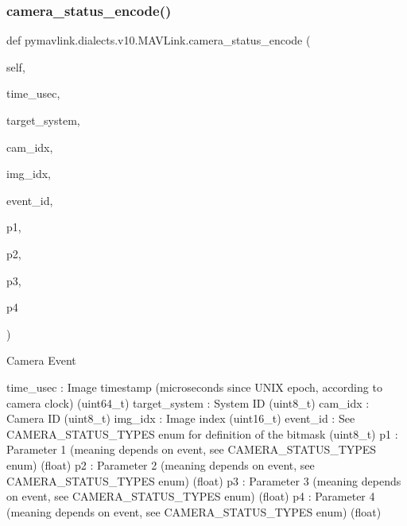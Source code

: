 \begin{DoxyVerb}
\begin{DoxyVerb}
\subsubsection{\texorpdfstring{camera\+\_\+status\+\_\+encode()}{camera\_status\_encode()}}
{\footnotesize\ttfamily def pymavlink.\+dialects.\+v10.\+M\+A\+V\+Link.\+camera\+\_\+status\+\_\+encode (\begin{DoxyParamCaption}\item[{}]{self,  }\item[{}]{time\+\_\+usec,  }\item[{}]{target\+\_\+system,  }\item[{}]{cam\+\_\+idx,  }\item[{}]{img\+\_\+idx,  }\item[{}]{event\+\_\+id,  }\item[{}]{p1,  }\item[{}]{p2,  }\item[{}]{p3,  }\item[{}]{p4 }\end{DoxyParamCaption})}

\begin{DoxyVerb}Camera Event

time_usec                 : Image timestamp (microseconds since UNIX epoch, according to camera clock) (uint64_t)
target_system             : System ID (uint8_t)
cam_idx                   : Camera ID (uint8_t)
img_idx                   : Image index (uint16_t)
event_id                  : See CAMERA_STATUS_TYPES enum for definition of the bitmask (uint8_t)
p1                        : Parameter 1 (meaning depends on event, see CAMERA_STATUS_TYPES enum) (float)
p2                        : Parameter 2 (meaning depends on event, see CAMERA_STATUS_TYPES enum) (float)
p3                        : Parameter 3 (meaning depends on event, see CAMERA_STATUS_TYPES enum) (float)
p4                        : Parameter 4 (meaning depends on event, see CAMERA_STATUS_TYPES enum) (float)\end{DoxyVerb}
 \mbox{\label{classpymavlink_1_1dialects_1_1v10_1_1MAVLink_a26f5b8a5517f932a4c4329b22b2ec905}} 

\end{DoxyVerb}
\end{DoxyVerb}
